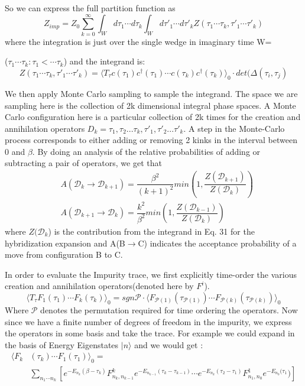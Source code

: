 \documentclass[10pt]{ruthesis}
\begin{document}
So we can express the full partition function as
\begin{equation}
Z_{imp}=Z_{0}\sum_{k=0}^{\infty}\int_{W}d\tau_{1}\cdots d\tau_{k}
\int_{W}d\tau'_{1}\cdots d\tau'_{k} Z(\tau_{1}\cdots \tau_{k}, \tau'_{1}\cdots \tau'_{k} )
\end{equation}
where the integration is just over the single wedge in imaginary time W={($\tau_{1}\cdots\tau_{k}:\tau_{1}<\cdots\tau_{k}$) and the integrand is:
\begin{equation}
Z(\tau_{1}\cdots \tau_{k}, \tau'_{1}\cdots \tau'_{k} )=\langle T_{\tau} c(\tau_{1})c^{\dagger}(\tau_{1})\cdots c(\tau_{k})c^{\dagger}(\tau_{k})\rangle_{0} \cdot det(\Delta({\tau_{i}},{\tau_{j}}) 
\end{equation}


We then apply Monte Carlo sampling to sample the integrand. The space we are sampling here is the collection of 2k dimensional integral phase spaces. A Monte Carlo configuration here is a particular collection of 2k times for the creation and annihilation operators $D_{k}={\tau_{1},\tau_{2}...\tau_{k},\tau'_{1},\tau'_{2}...\tau'_{k}}$. A step in the Monte-Carlo process corresponds to either adding or removing 2 kinks in the interval between 0 and $\beta$. By doing an analysis of the relative probabilities of adding or subtracting a pair of operators, we get that
\begin{align}
& A(\mathcal{D}_{k}\rightarrow \mathcal{D}_{k+1})=\dfrac{\beta^{2}}{(k+1)^{2}} min \left(1,\dfrac{Z(\mathcal{D}_{k+1})}{Z(\mathcal{D}_{k})} \right)\\
& A(\mathcal{D}_{k+1}\rightarrow \mathcal{D}_{k})=\dfrac{k^{2}}{\beta^{2}} min \left(1,\dfrac{Z(\mathcal{D}_{k-1})}{Z(\mathcal{D}_{k})} \right)
 \end{align} 
 where $Z(\mathcal{D}_{k}$) is the contribution from the integrand in Eq. 31 for the hybridization expansion and A(B$\rightarrow$C) indicates the acceptance probability of a move from configuration B to C.
 
 In order to evaluate the Impurity trace, we first explicitly time-order the various creation and annihilation operators(denoted here by $F^{i}$). 
 \begin{equation}
 \langle T_{\tau} F_{1}(\tau_{1})\cdots F_{k}(\tau_{k})\rangle _{0} = sgn \mathcal{P}\cdot\langle F_{\mathcal{P}(1)}(\tau_{\mathcal{P}(1)})\cdots F_{\mathcal{P}(k)}(\tau_{\mathcal{P}(k)})\rangle _{0} 
 \end{equation}
Where $\mathcal{P}$ denotes the permutation required for time ordering the operators. Now since we have a finite number of degrees of freedom in the impurity, we express the operators in some basis and take the trace. For example we could expand in the basis of Energy Eigenstates $|n\rangle$ and we would get :
\begin{align}
\langle F_{k}&(\tau_{k})\cdots F_{1}(\tau_{1})\rangle _{0} =\\
&\sum_{n_{1}\cdots n_{k}} \left[e^{-E_{n_{k}}(\beta-\tau_{k})}F^{k}_{n_{k},n_{k-1}}e^{-E_{n_{k-1}}(\tau_{k}-\tau_{k-1})}\cdots e^{-E_{n_{k}}(\tau_{2}-\tau_{1})}F^{1}_{n_{1},n_{0}}e^{-E_{n_{0}}(\tau_{1}})\right]
\end{align}

}
\end{document}
